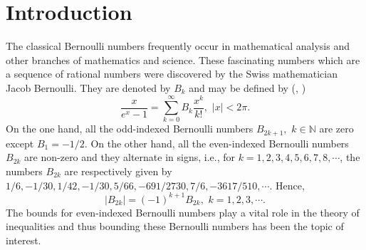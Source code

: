 \documentclass[eqnumis, pdf]{yjb}
\begin{document}
\section{Introduction}\label{sec1}
The classical Bernoulli numbers frequently occur in mathematical analysis and other branches of mathematics and science. These fascinating numbers which are a sequence of rational numbers were discovered by the Swiss mathematician Jacob Bernoulli. They are denoted by $ B_k $ and may be defined by (\cite[p. 804]{abramowitz}, \cite[p. 3]{temme})
$$ \frac{x}{e^x - 1} = \sum_{k=0}^\infty B_k \frac{x^k}{k!},  \, \, \vert x \vert < 2\pi. $$
 On the one hand, all the odd-indexed Bernoulli numbers $B_{2k+1} , \, \,  k \in \mathbb{N}$ are zero except $ B_1 = -1/2$. On the other hand, all the even-indexed Bernoulli numbers $B_{2k}$ are non-zero and they alternate in signs, i.e., for $ k= 1, 2, 3, 4, 5, 6, 7, 8, \cdots$, the numbers $ B_{2k} $ are respectively given by $1/6, -1/30, 1/42, -1/30, 5/66, -691/2730, 7/6, -3617/510, \cdots.$ Hence, $$ \vert B_{2k} \vert = (-1)^{k+1} B_{2k}, \, \, k = 1, 2, 3, \cdots. $$
The bounds for even-indexed Bernoulli numbers play a vital role in the theory of inequalities and thus bounding these Bernoulli numbers has been the topic of interest.
\end{document}
